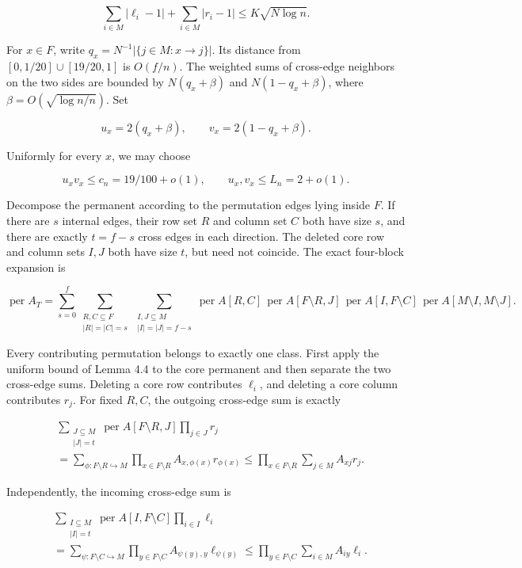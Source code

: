 \documentclass[11pt,a4paper]{article}
\begin{document}
\[
\sum_{i\in M}|\ell_i-1|+\sum_{i\in M}|r_i-1|
\le K\sqrt{N\log n}.
\]

For \(x\in F\), write \(q_x=N^{-1}|\{j\in M:x\to j\}|\). Its distance from \([0,1/20]\cup[19/20,1]\) is \(O(f/n)\). The weighted sums of cross-edge neighbors on the two sides are bounded by \(N(q_x+\beta)\) and \(N(1-q_x+\beta)\), where \(\beta=O(\sqrt{\log n/n})\). Set

\[
u_x=2(q_x+\beta),\qquad v_x=2(1-q_x+\beta).
\]

Uniformly for every \(x\), we may choose

\[
u_xv_x\le c_n=19/100+o(1),\qquad
u_x,v_x\le L_n=2+o(1).
\]

Decompose the permanent according to the permutation edges lying inside \(F\). If there are \(s\) internal edges, their row set \(R\) and column set \(C\) both have size \(s\), and there are exactly \(t=f-s\) cross edges in each direction. The deleted core row and column sets \(I,J\) both have size \(t\), but need not coincide. The exact four-block expansion is

\[
\operatorname{per}A_T
=\sum_{s=0}^{f}
\sum_{\substack{R,C\subseteq F\\|R|=|C|=s}}
\sum_{\substack{I,J\subseteq M\\|I|=|J|=f-s}}
\operatorname{per}A[R,C]\,
\operatorname{per}A[F\setminus R,J]\,
\operatorname{per}A[I,F\setminus C]\,
\operatorname{per}A[M\setminus I,M\setminus J].
\]

Every contributing permutation belongs to exactly one class. First apply the uniform bound of Lemma 4.4 to the core permanent and then separate the two cross-edge sums. Deleting a core row contributes \(\ell_i\), and deleting a core column contributes \(r_j\). For fixed \(R,C\), the outgoing cross-edge sum is exactly

\[
\begin{aligned}
&\sum_{\substack{J\subseteq M\\|J|=t}}
\operatorname{per}A[F\setminus R,J]\prod_{j\in J}r_j\\
&=\sum_{\phi:F\setminus R\hookrightarrow M}
\prod_{x\in F\setminus R}A_{x,\phi(x)}r_{\phi(x)}
\le\prod_{x\in F\setminus R}\sum_{j\in M}A_{xj}r_j.
\end{aligned}
\]

Independently, the incoming cross-edge sum is

\[
\begin{aligned}
&\sum_{\substack{I\subseteq M\\|I|=t}}
\operatorname{per}A[I,F\setminus C]\prod_{i\in I}\ell_i\\
&=\sum_{\psi:F\setminus C\hookrightarrow M}
\prod_{y\in F\setminus C}A_{\psi(y),y}\ell_{\psi(y)}
\le\prod_{y\in F\setminus C}\sum_{i\in M}A_{iy}\ell_i.
\end{aligned}
\]
\end{document}
